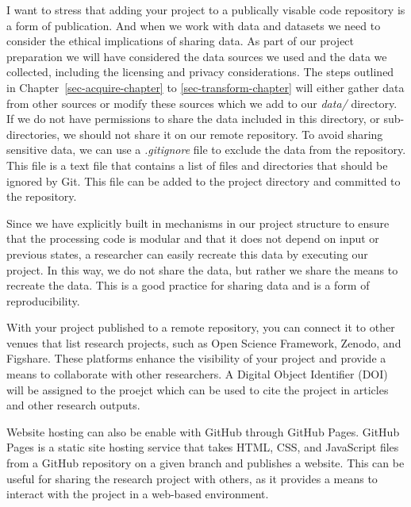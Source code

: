 \documentclass[
  letterpaper,
]{latex/krantz}
\theoremstyle{definition}
\theoremstyle{remark}
\begin{document}
I want to stress that adding your project to a publically visable code
repository is a form of publication. And when we work with data and
datasets we need to consider the ethical implications of sharing data.
As part of our project preparation we will have considered the data
sources we used and the data we collected, including the licensing and
privacy considerations. The steps outlined in
Chapter~\ref{sec-acquire-chapter} to \ref{sec-transform-chapter} will
either gather data from other sources or modify these sources which we
add to our \emph{data/} directory. If we do not have permissions to
share the data included in this directory, or sub-directories, we should
not share it on our remote repository. To avoid sharing sensitive data,
we can use a \emph{.gitignore} file to exclude the data from the
repository. This file is a text file that contains a list of files and
directories that should be ignored by Git. This file can be added to the
project directory and committed to the repository.

Since we have explicitly built in mechanisms in our project structure to
ensure that the processing code is modular and that it does not depend
on input or previous states, a researcher can easily recreate this data
by executing our project. In this way, we do not share the data, but
rather we share the means to recreate the data. This is a good practice
for sharing data and is a form of reproducibility.

With your project published to a remote repository, you can connect it
to other venues that list research projects, such as Open Science
Framework, Zenodo, and Figshare. These platforms enhance the visibility
of your project and provide a means to collaborate with other
researchers. A Digital Object Identifier (DOI) will be assigned to the
proejct which can be used to cite the project in articles and other
research outputs.

Website hosting can also be enable with GitHub through GitHub Pages.
GitHub Pages is a static site hosting service that takes HTML, CSS, and
JavaScript files from a GitHub repository on a given branch and
publishes a website. This can be useful for sharing the research project
with others, as it provides a means to interact with the project in a
web-based environment.
\end{document}
